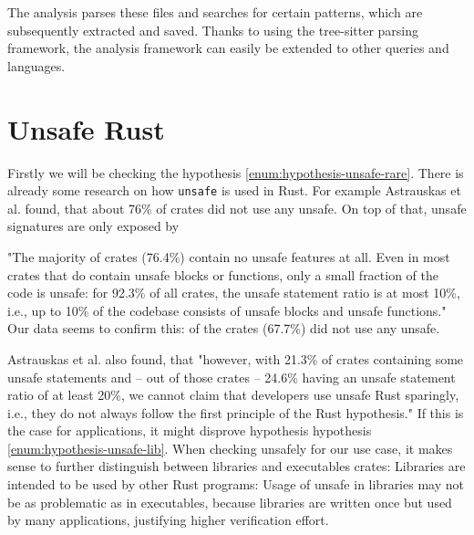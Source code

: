 \documentclass{book}
\newcommand{\code}[1]{\texttt{#1}}
\theoremstyle{definition}
\begin{document}

The analysis parses these files and searches for certain patterns, which are subsequently extracted and saved.
Thanks to using the tree-sitter parsing framework, the analysis framework can easily be extended to other queries and languages.

\label{ss:unsafe-rust}\section{Unsafe Rust}

Firstly we will be checking the hypothesis \ref{enum:hypothesis-unsafe-rare}.
There is already some research on how \code{unsafe} is used in Rust. For example Astrauskas et al. \cite{astrauskas_how_2020} found, that about 76\% of crates did not use any unsafe. On top of that, unsafe signatures are only exposed by

"The majority of crates (76.4\%) contain no unsafe features at all. Even in most crates that do contain unsafe blocks or functions, only a small fraction of the code is unsafe: for 92.3\% of all crates, the unsafe statement ratio is at most 10\%, i.e., up to 10\% of the codebase consists of unsafe blocks and unsafe functions." \cite[p. 13]{astrauskas_how_2020}
Our data seems to confirm this:  of the  crates (67.7\%) did not use any unsafe. 

Astrauskas et al. also found, that "however, with 21.3\% of crates containing some unsafe statements and – out of those crates – 24.6\% having an unsafe statement ratio of at least 20\%, we cannot claim that developers use unsafe Rust sparingly, i.e., they do not always follow the first principle of the Rust hypothesis." \cite[p. 14]{astrauskas_how_2020}
If this is the case for applications, it might disprove hypothesis hypothesis \ref{enum:hypothesis-unsafe-lib}. 
When checking unsafely for our use case, it makes sense to further distinguish between libraries and executables crates: Libraries are intended to be used by other Rust programs: Usage of unsafe in libraries may not be as problematic as in executables, because libraries are written once but used by many applications, justifying higher verification effort. 
\end{document}
